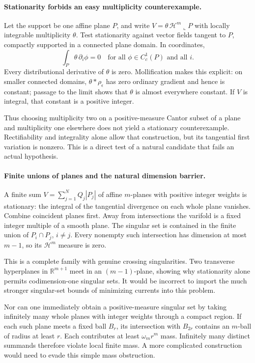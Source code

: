 \documentclass[11pt]{article}
\begin{document}
\paragraph{Stationarity forbids an easy multiplicity counterexample.}
Let the support be one affine plane $P$, and write
$V=\theta\,\mathcal H^m\!\llcorner P$ with locally
integrable multiplicity $\theta$. Test stationarity
against vector fields tangent to $P$, compactly
supported in a connected plane domain. In coordinates,
\[
              \int_P\theta\,\partial_i\phi=0
              \quad\text{for all }\phi\in C_c^1(P)
              \text{ and all }i.
\]
Every distributional derivative of $\theta$ is zero.
Mollification makes this explicit: on smaller connected
domains, $\theta*\rho_\epsilon$ has zero ordinary
gradient and hence is constant; passage to the limit
shows that $\theta$ is almost everywhere constant.
If $V$ is integral, that constant is a positive integer.

Thus choosing multiplicity two on a positive-measure
Cantor subset of a plane and multiplicity one elsewhere
does not yield a stationary counterexample. Rectifiability
and integrality alone allow that construction, but its
tangential first variation is nonzero. This is a direct
test of a natural candidate that fails an actual hypothesis.

\paragraph{Finite unions of planes and the natural dimension barrier.}
A finite sum $V=\sum_{j=1}^N Q_j|P_j|$ of affine $m$-planes
with positive integer weights is stationary: the integral
of the tangential divergence on each whole plane vanishes.
Combine coincident planes first. Away from intersections
the varifold is a fixed integer multiple of a smooth plane.
The singular set is contained in the finite union of
$P_i\cap P_j$, $i\ne j$. Every nonempty such intersection
has dimension at most $m-1$, so its $\mathcal H^m$ measure
is zero.

This is a complete family with genuine crossing
singularities. Two transverse hyperplanes in
$\mathbb R^{m+1}$ meet in an $(m-1)$-plane, showing why
stationarity alone permits codimension-one singular
sets. It would be incorrect to import the much
stronger singular-set bounds of minimizing currents
into this problem.

Nor can one immediately obtain a positive-measure
singular set by taking infinitely many whole planes
with integer weights through a compact region.
If each such plane meets a fixed ball $B_r$,
its intersection with $B_{2r}$ contains an
$m$-ball of radius at least $r$. Each contributes
at least $\omega_mr^m$ mass. Infinitely many
distinct summands therefore violate local finite
mass. A more complicated construction would need
to evade this simple mass obstruction.
\end{document}
